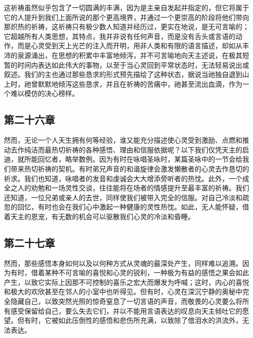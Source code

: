 \par

这祈祷虽然似乎包含了一切圆满的丰满，因为是主亲自发起并指定的，但它将属于它的人提升到我们上面所说的那个更高境界，并通过一个更崇高的阶段将他们带向那炽热的祈祷，这祈祷只有极少数人知道并经历过，更实在地说，是无可言喻的；它超越所有人类思想，其特点，我并非说有任何声音，而是没有舌头或言语的动作，而是心灵受到天上光芒的注入而开明，用非人类和有限的语言描述，却如从丰沛的泉源涌出，在思想的积累中丰富地倾泻，并不可言喻地向天主述说，在极其短暂的时间内表达如此伟大的事物，以至于当心灵回到平常状态时，无法轻易说出或叙述。我们的主也通过那些恳求的形式预先描绘了这种状态，据说当祂独自退到山上时，祂曾默默地倾泻这些恳求，并且在祈祷的苦痛中，祂甚至流出血滴，作为一个难以模仿的决心榜样。\par


\subsection{第二十六章}

\par

然而，无论一个人天生拥有何等经验，谁又能充分描述使心灵受到激励、点燃和推动去作纯洁而最热切祈祷的各种感悟、理由和信服依据呢？以下我们仅凭天主的启迪，就所能回忆者，略举数例。因为有时在咏唱圣咏时，某篇圣咏中的一节会给我们带来热切祈祷的契机。有时弟兄声音的和谐旋律会激发懒散者的心灵去作恳切的祈求。我们也知道，咏唱者的发音和虔诚会大大增添旁听者的热忱。此外，一个成全之人的劝勉和一场灵性交谈，往往能将在场者的情感提升至最丰富的祈祷。我们还知道，一位兄弟或亲人的去世，同样使我们被带入完全的信服。对自己冷淡和疏忽的回忆，有时也会在我们心中激起一种健康的灵性热忱。如此，无人能怀疑，借着天主的恩宠，有无数的机会可以驱散我们心灵的冷淡和昏睡。\par


\subsection{第二十七章}

\par

然而，那些感悟本身如何以及以何种方式从灵魂的最深处产生，同样难以追溯。因为有时，借着某种不可言喻的喜悦和心灵的锐利，一种极为有益的感悟之果会如此产生，以致它实际上因那不可控制的喜乐之宏大而爆发为呼喊；这时，内心的喜悦和极大的欢欣甚至在邻人的小室中也听得见。但有时，心灵在深沉宁静的奥秘中完全隐藏自己，以致突然光照的惊奇窒息了一切言语的声音，而敬畏的心灵要么将所有感受保留给自己，要么失去它们，并以不能用言语表达的叹息向天主倾吐它的愿望。但有时，它被如此压倒性的感悟和悲伤所充满，以致除了借泪水的洪流外，无法表达。\par

